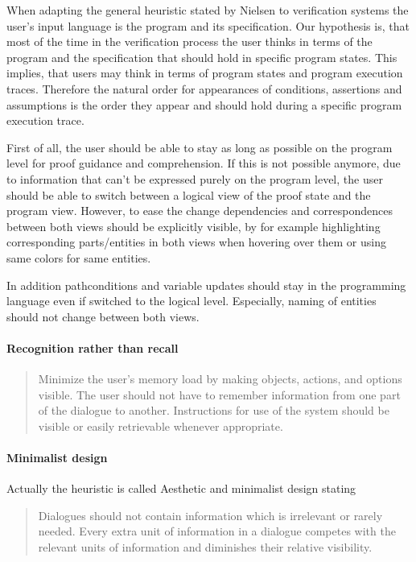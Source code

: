 \documentclass{article}
\begin{document}
When adapting the general heuristic stated by Nielsen to verification systems 
the user's input language is the program and its specification. Our hypothesis 
is, that most of the time in the verification process the user thinks in 
terms of the program and the specification that should hold in specific 
program states. This implies, that users may think in terms of program states 
and program execution traces. Therefore the natural order for appearances of 
conditions, assertions and assumptions is the order they appear and 
should hold during a specific program execution trace.

First of all, the user should be able to stay as long as possible on the 
program level for proof guidance and comprehension. If this is not possible 
anymore, due to information that can't be expressed purely on the program 
level, the user should be able to switch between a logical view of the proof 
state and the program view. However, to ease the change dependencies and 
correspondences between both views should be explicitly visible, by for example 
highlighting corresponding parts/entities in both views when hovering over them 
or using same colors for same entities.

In addition pathconditions and variable updates should stay in the programming 
language even if switched to the logical level. Especially, naming of entities 
should not change between both views.
\paragraph{Recognition rather than recall}
\begin{quote}
 Minimize the user's memory load by making objects, actions, and options 
visible. The user should not have to remember information from one part of the 
dialogue to another. Instructions for use of the system should be visible or 
easily retrievable whenever appropriate.
\end{quote}

\paragraph{Minimalist design}
Actually the heuristic is called Aesthetic and minimalist design stating 
\begin{quote}
 Dialogues should not contain information which is irrelevant or rarely needed. 
Every extra unit of information in a dialogue competes with the relevant units 
of information and diminishes their relative visibility.
\end{quote}
\end{document}
